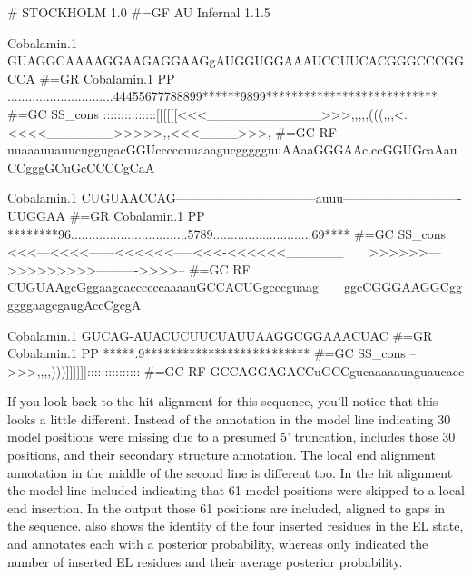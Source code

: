 
\label{cmalign-cobalamin}
\begin{sreoutput}
# STOCKHOLM 1.0
#=GF AU Infernal 1.1.5

Cobalamin.1         ------------------------------GUAGGCAAAAGGAAGAGGAAGgAUGGUGGAAAUCCUUCACGGGCCCGGCCA
#=GR Cobalamin.1 PP ..............................44455677788899******9899***************************
#=GC SS_cons        :::::::::::::::[[[[[[<<<____________>>>,,,,,(((,,,<.<<<<_______>>>>>,,<<<____>>>,
#=GC RF             uuaaauuauucuggugacGGUcccccuuaaagucggggguuAAaaGGGAAc.ccGGUGcaAauCCgggGCuGcCCCCgCaA


Cobalamin.1         CUGUAACCAG---------------------------------auuu----------------------------UUGGAA
#=GR Cobalamin.1 PP ********96.................................5789............................69****
#=GC SS_cons        <<<---<<<<------<<<<<<-----<<<-<<<<<<______~~~~>>>>>>--->>>>>>>>>---------->>>>--
#=GC RF             CUGUAAgcGggaagcaccccccaaaauGCCACUGgcccguaag~~~~ggcCGGGAAGGCggggggaagcgaugAccCgcgA


Cobalamin.1         GUCAG-AUACUCUUCUAUUAAGGCGGAAACUAC
#=GR Cobalamin.1 PP *****.9**************************
#=GC SS_cons        -->>>,,,,)))]]]]]]:::::::::::::::
#=GC RF             GCCAGGAGACCuGCCgucaaaaauaguaucacc

\end{sreoutput}

If you look back to the  hit alignment for this sequence,
you'll notice that this looks a little different. Instead of the
\otext{<[30]*} annotation in the model line indicating 30 model
positions were missing due to a presumed 5' truncation, 
includes those 30 positions, and their secondary structure
annotation. The local end alignment annotation in the middle of the
second line is different too. In the  hit alignment the
model line included \otext{*[61]*} indicating that 61 model positions
were skipped to a local end insertion. In the  output
those 61 positions are included, aligned to gaps in the sequence. 
 also shows the identity of the four inserted residues
in the EL state, and annotates each with a posterior probability,
whereas  only indicated the number of inserted EL
residues and their average posterior probability. 

